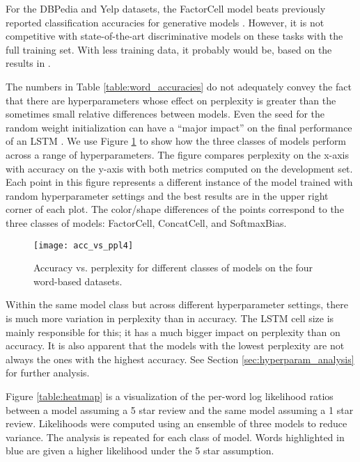 For the DBPedia and Yelp datasets, the FactorCell model beats previously reported classification accuracies for generative models \cite{Yogatama2017GenerativeAD}. However, it is not competitive with state-of-the-art discriminative models on these tasks with the full training set.  With less training data, it probably would be, based on the results in \cite{Yogatama2017GenerativeAD}. 

The numbers in Table \ref{table:word_accuracies} do not adequately convey the fact that there are hyperparameters whose effect on perplexity is greater than the sometimes small relative differences between models. Even the seed for the random weight initialization can have a ``major impact'' on the final performance of an LSTM \cite{reimers2017reporting}. We use Figure \ref{fig:acc_vs_ppl4} to show how the three classes of models perform across a range of hyperparameters. The figure compares perplexity on the x-axis with accuracy on the y-axis with both metrics computed on the development set. Each point in this figure represents a different instance of the model trained with random hyperparameter settings and the best results are in the upper right corner of each plot. The color/shape differences of the points correspond to the three classes of models: FactorCell, ConcatCell, and SoftmaxBias. 

\begin{figure}[h]
\centering
\texttt{[image: acc\_vs\_ppl4]}
\caption{Accuracy vs. perplexity for different classes of models on the four word-based datasets.}
\label{fig:acc_vs_ppl4}
\end{figure}

Within the same model class but across different hyperparameter settings, there is much more variation in perplexity than in accuracy. The LSTM cell size is mainly responsible for this; it has a much bigger impact on perplexity than on accuracy. It is also apparent that the models with the lowest perplexity are not always the ones with the highest accuracy. See Section \ref{sec:hyperparam_analysis} for further analysis.

Figure \ref{table:heatmap} is a visualization of the per-word log likelihood ratios between a model assuming a 5 star review and the same model assuming a 1 star review. Likelihoods were computed using an ensemble of three models to reduce variance. The analysis is repeated for each class of model. Words highlighted in blue are given a higher likelihood under the 5 star assumption.

